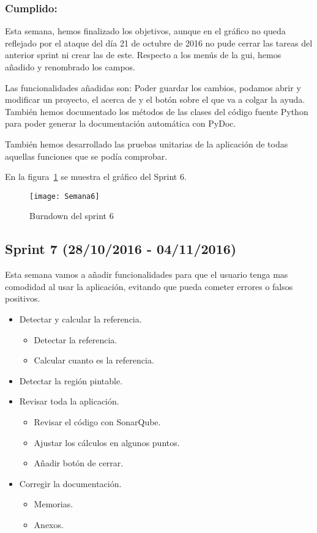 \subsubsection{Cumplido:}
Esta semana, hemos finalizado los objetivos, aunque en el gráfico no queda reflejado por el ataque del día 21 de octubre de 2016 \cite{wiki:Dyn} no pude cerrar las tareas del anterior sprint ni crear las de este.
Respecto a los menús de la gui, hemos añadido y renombrado los campos.

Las funcionalidades añadidas son:
Poder guardar los cambios, podamos abrir y modificar un proyecto, el acerca de y el botón sobre el que va a colgar la ayuda.
También hemos documentado los métodos de las clases del código fuente Python para poder generar la documentación automática con PyDoc.

También hemos desarrollado las pruebas unitarias de la aplicación de todas aquellas funciones que se podía comprobar. 


En la figura~\ref{fig:A.2.6} se muestra el gráfico del Sprint 6.

\begin{figure}[h]
\centering
\texttt{[image: Semana6]}
\caption{Burndown del sprint 6}
\label{fig:A.2.6}
\end{figure}

\subsection{Sprint 7 (28/10/2016 - 04/11/2016)}

Esta semana vamos a añadir funcionalidades para que el usuario tenga mas comodidad al usar la aplicación, evitando que pueda cometer errores o falsos positivos.


\begin{itemize}
	\item Detectar y calcular la referencia.
		\begin{itemize}
			\item Detectar la referencia.
			\item Calcular cuanto es la referencia.
		\end{itemize}
	\item Detectar la región pintable.
	\item Revisar toda la aplicación.
		\begin{itemize}
			\item Revisar el código con SonarQube.
			\item Ajustar los cálculos en algunos puntos.
			\item Añadir botón de cerrar.
		\end{itemize}
	\item Corregir la documentación.
		\begin{itemize}
			\item Memorias.
			\item Anexos.
		\end{itemize}			
\end{itemize}
